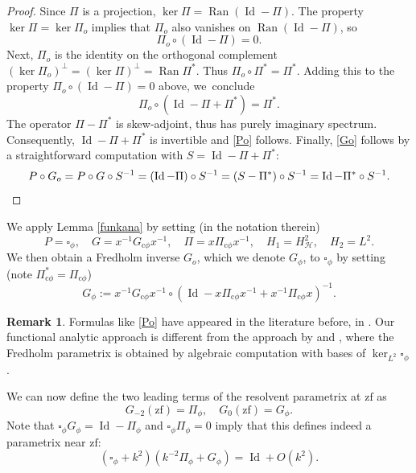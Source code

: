 \documentclass[JEP,XML,SOM,Unicode,NoFloatCountersInSection,published]{cedram}
\newcommand{\cphi}{{\mathrm{c}\phi}}
\theoremstyle{plain}
\theoremstyle{definition}
\newtheorem{Rem}[Th]{Remark}
\newcommand{\zf}{{\mathrm{zf}}}
\DeclareMathOperator{\Id}{Id}
\DeclareMathOperator\Ran{Ran}
\newcommand{\Hsplit}{H_{\mathscr{H}}}
\begin{document}
\begin{proof}
Since $\Pi$ is a projection, $\ker \Pi = \Ran(\Id - \Pi)$.
The property $\ker \Pi = \ker \Pi_o$ implies that $\Pi_o$ also vanishes on
$\Ran(\Id - \Pi)$, so
\[
\Pi_o \circ (\Id - \Pi) = 0.
\]
Next, $\Pi_o$ is the identity on the orthogonal complement $(\ker \Pi_o)^\perp = (\ker \Pi)^\perp =
\Ran\Pi^*$. Thus $\Pi_o \circ \Pi^* = \Pi^*$. Adding this to the property
$\Pi_o \circ (\Id - \Pi) = 0$ above, we~conclude
\[
\Pi_o \circ (\Id - \Pi + \Pi^*) = \Pi^*.
\]
The operator $\Pi - \Pi^*$ is skew-adjoint, thus has purely imaginary spectrum.
Consequently, $\Id - \Pi + \Pi^*$ is invertible and \eqref{Po} follows.
Finally, \eqref{Go} follows by a straightforward computation with $S= \Id - \Pi + \Pi^*$:
\[
P\circ G_o=P \circ G \circ S^{-1} =
\left(\Id - \Pi\right) \circ S^{-1}
= \left(S - \Pi^*\right) \circ S^{-1} = \Id - \Pi^* \circ S^{-1}.\qedhere
\]
\end{proof}

We apply Lemma \ref{funkana} by setting (in the notation therein)
\[
P=\square_\phi, \quad G=x^{-1}G_{\cphi}x^{-1}, \quad \Pi=x\Pi_{\cphi}x^{-1},\quad
H_1=\Hsplit^2,\quad H_2=L^2.
\]
We then obtain a Fredholm inverse $G_o$, which we denote $G_\phi$, to $\square_\phi$ by setting (note $\Pi_{\cphi}^*=\Pi_{\cphi}$)
\begin{equation}\label{Gphi}
G_\phi:= x^{-1} G_{\cphi} x^{-1} \circ (\Id - x \Pi_{\cphi} x^{-1} + x^{-1} \Pi_{\cphi} x)^{-1}.
\end{equation}

\begin{Rem}
Formulas like \eqref{Po} have appeared in the literature before, \eg in \cite[Lem.\,3.5]{BLZ09}.
Our functional analytic approach is different from the
approach by \cite{guillarmou2014low} and \cite{guillarmou2008resolvent}, where
the Fredholm parametrix is obtained by algebraic computation with bases of
$\ker_{L^2} \square_{\phi}$.
\end{Rem}

We can now define the two leading terms of the
resolvent parametrix at $\zf$ as
\begin{equation}\label{Gkphi}
G_{-2}(\zf) = \Pi_\phi,\quad G_0(\zf) = G_\phi.
\end{equation}
Note that $\square_{\phi} G_{\phi} = \Id - \Pi_{\phi}$ and $\square_\phi \Pi_\phi=0$ imply that this defines indeed a parametrix near $\zf$:
\begin{equation}
\label{eqn:zf param eqn}
(\square_\phi+k^2)(k^{-2} \Pi_\phi + G_\phi) = \Id + O(k^2).
\end{equation}
\end{document}
